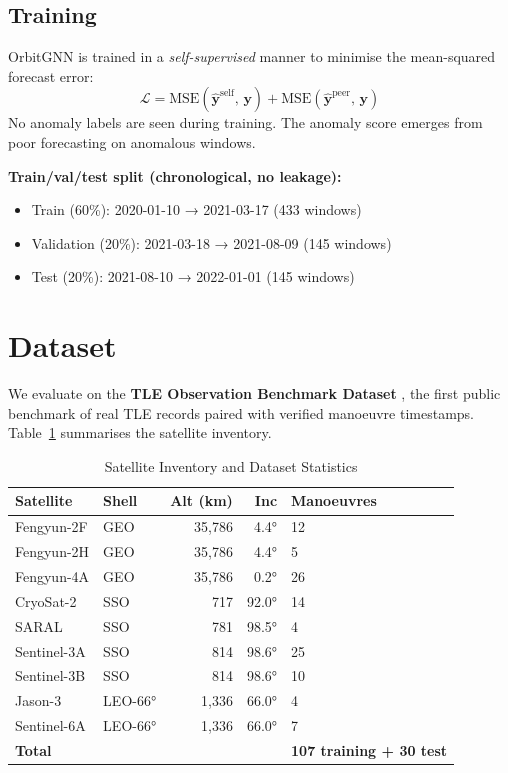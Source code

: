 \documentclass[conference]{IEEEtran}
\begin{document}
\subsection{Training}

OrbitGNN is trained in a \emph{self-supervised} manner to minimise the
mean-squared forecast error:
\begin{equation}
  \mathcal{L} = \text{MSE}(\hat{\mathbf{y}}^\text{self},\,\mathbf{y})
              + \text{MSE}(\hat{\mathbf{y}}^\text{peer},\,\mathbf{y})
\end{equation}
No anomaly labels are seen during training. The anomaly score emerges
from poor forecasting on anomalous windows.

\textbf{Train/val/test split (chronological, no leakage):}
\begin{itemize}
  \item Train (60\%): 2020-01-10 → 2021-03-17 (433 windows)
  \item Validation (20\%): 2021-03-18 → 2021-08-09 (145 windows)
  \item Test (20\%): 2021-08-10 → 2022-01-01 (145 windows)
\end{itemize}

\section{Dataset}
\label{sec:dataset}

We evaluate on the \textbf{TLE Observation Benchmark Dataset}
\cite{shorten2023}, the first public benchmark of real TLE records
paired with verified manoeuvre timestamps. Table~\ref{tab:dataset}
summarises the satellite inventory.

\begin{table}[h]
\centering
\caption{Satellite Inventory and Dataset Statistics}
\label{tab:dataset}
\begin{tabular}{@{}llrrl@{}}
\toprule
Satellite & Shell & Alt (km) & Inc & Manoeuvres \\
\midrule
Fengyun-2F & GEO & 35,786 & 4.4° & 12 \\
Fengyun-2H & GEO & 35,786 & 4.4° & 5 \\
Fengyun-4A & GEO & 35,786 & 0.2° & 26 \\
CryoSat-2  & SSO & 717 & 92.0° & 14 \\
SARAL      & SSO & 781 & 98.5° & 4 \\
Sentinel-3A & SSO & 814 & 98.6° & 25 \\
Sentinel-3B & SSO & 814 & 98.6° & 10 \\
Jason-3    & LEO-66° & 1,336 & 66.0° & 4 \\
Sentinel-6A & LEO-66° & 1,336 & 66.0° & 7 \\
\midrule
\textbf{Total} & & & & \textbf{107 training + 30 test} \\
\bottomrule
\end{tabular}
\end{table}
\end{document}
